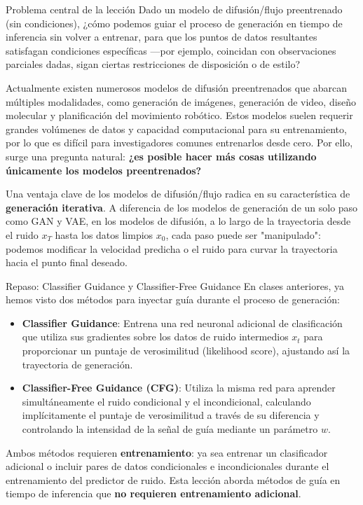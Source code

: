 \documentclass[a4paper]{article}
\begin{document}
\begin{importantbox}{Problema central de la lección}
Dado un modelo de difusión/flujo preentrenado (sin condiciones), ¿cómo podemos guiar el proceso de generación en tiempo de inferencia sin volver a entrenar, para que los puntos de datos resultantes satisfagan condiciones específicas —por ejemplo, coincidan con observaciones parciales dadas, sigan ciertas restricciones de disposición o de estilo?
\end{importantbox}

Actualmente existen numerosos modelos de difusión preentrenados que abarcan múltiples modalidades, como generación de imágenes, generación de video, diseño molecular y planificación del movimiento robótico. Estos modelos suelen requerir grandes volúmenes de datos y capacidad computacional para su entrenamiento, por lo que es difícil para investigadores comunes entrenarlos desde cero. Por ello, surge una pregunta natural: \textbf{¿es posible hacer más cosas utilizando únicamente los modelos preentrenados?}

Una ventaja clave de los modelos de difusión/flujo radica en su característica de \textbf{generación iterativa}. A diferencia de los modelos de generación de un solo paso como GAN y VAE, en los modelos de difusión, a lo largo de la trayectoria desde el ruido $x_T$ hasta los datos limpios $x_0$, cada paso puede ser "manipulado": podemos modificar la velocidad predicha o el ruido para curvar la trayectoria hacia el punto final deseado.

\begin{knowledgebox}{Repaso: Classifier Guidance y Classifier-Free Guidance}
En clases anteriores, ya hemos visto dos métodos para inyectar guía durante el proceso de generación:
\begin{itemize}
    \item \textbf{Classifier Guidance}: Entrena una red neuronal adicional de clasificación que utiliza sus gradientes sobre los datos de ruido intermedios $x_t$ para proporcionar un puntaje de verosimilitud (likelihood score), ajustando así la trayectoria de generación.
    \item \textbf{Classifier-Free Guidance (CFG)}: Utiliza la misma red para aprender simultáneamente el ruido condicional y el incondicional, calculando implícitamente el puntaje de verosimilitud a través de su diferencia y controlando la intensidad de la señal de guía mediante un parámetro $w$.
\end{itemize}
Ambos métodos requieren \textbf{entrenamiento}: ya sea entrenar un clasificador adicional o incluir pares de datos condicionales e incondicionales durante el entrenamiento del predictor de ruido. Esta lección aborda métodos de guía en tiempo de inferencia que \textbf{no requieren entrenamiento adicional}.
\end{knowledgebox}
\end{document}

